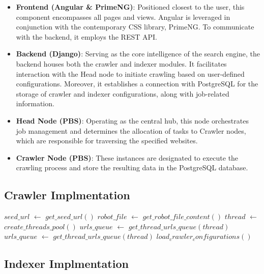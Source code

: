 \begin{itemize}
  \item \textbf{Frontend (Angular \& PrimeNG)}: Positioned closest to the user, this component encompasses all pages and views. Angular is leveraged in conjunction with the contemporary CSS library, PrimeNG. To communicate with the backend, it employs the REST API.
  \item \textbf{Backend (Django)}: Serving as the core intelligence of the search engine, the backend houses both the crawler and indexer modules. It facilitates interaction with the Head node to initiate crawling based on user-defined configurations. Moreover, it establishes a connection with PostgreSQL for the storage of crawler and indexer configurations, along with job-related information.
  \item \textbf{Head Node (PBS)}: Operating as the central hub, this node orchestrates job management and determines the allocation of tasks to Crawler nodes, which are responsible for traversing the specified websites.
  \item \textbf{Crawler Node (PBS)}: These instances are designated to execute the crawling process and store the resulting data in the PostgreSQL database.
\end{itemize}


\subsection{Crawler Implmentation}
\begin{algorithm}[H]
	\caption{$Start Crawling$}\label{alg:alg1}
	\begin{algorithmic}
	    \State $seed\_url$ $\gets$ $get\_seed\_url()$
	    \State $robot\_file$ $\gets$ $get\_robot\_file\_content()$
	    \State $thread$ $\gets$ $create\_threads\_pool()$
	    \State $urls\_queue$ $\gets$ $get\_thread\_urls\_queue(thread)$
	    	\EndIf
		    \State $urls\_queue$ $\gets$ $get\_thread\_urls\_queue(thread)$
		\Else
			\State $load_crawler_configurations()$
		\EndIf
		\EndWhile

	\end{algorithmic}
\end{algorithm}

\subsection{Indexer Implmentation}